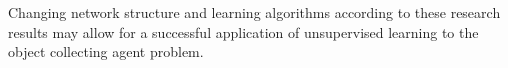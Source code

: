 \documentclass[10pt,a4paper,DIV=11]{scrreprt}
\begin{document}
Changing network structure and learning algorithms according to these research results may allow for a successful 
application of unsupervised learning to the object collecting agent problem. 


\newpage


\listoffigures
\listoftables
\listofalgorithms
\lstlistoflistings




\end{document}
